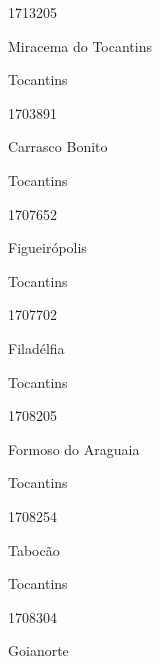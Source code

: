 \documentclass[
  letterpaper,
]{report}
\begin{document}
\n      

1713205

\n      

Miracema do Tocantins

\n    

\n    

\n      

Tocantins

\n      

1703891

\n      

Carrasco Bonito

\n    

\n    

\n      

Tocantins

\n      

1707652

\n      

Figueirópolis

\n    

\n    

\n      

Tocantins

\n      

1707702

\n      

Filadélfia

\n    

\n    

\n      

Tocantins

\n      

1708205

\n      

Formoso do Araguaia

\n    

\n    

\n      

Tocantins

\n      

1708254

\n      

Tabocão

\n    

\n    

\n      

Tocantins

\n      

1708304

\n      

Goianorte
\end{document}
